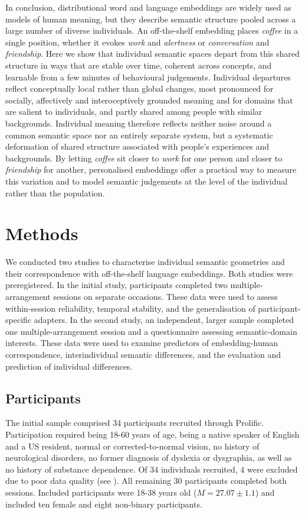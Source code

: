 \documentclass[pdflatex,sn-mathphys]{sn-jnl}
\begin{document}
In conclusion, distributional word and language embeddings are widely used as models of human meaning\cite{Goldstein2024,Xu2026,Caliskan2017,Wulff2025,Lee2025,Huth2016,Karpukhin2020}, but they describe semantic structure pooled across a large number of diverse individuals\cite{Bender2021,Atari2023,Paullada2021}. An off-the-shelf embedding places \textit{coffee} in a single position, whether it evokes \textit{work} and \textit{alertness} or \textit{conversation} and \textit{friendship}. Here we show that individual semantic spaces depart from this shared structure in ways that are stable over time, coherent across concepts, and learnable from a few minutes of behavioural judgements. Individual departures reflect conceptually local rather than global changes, most pronounced for socially, affectively and interoceptively grounded meaning and for domains that are salient to individuals, and partly shared among people with similar backgrounds. Individual meaning therefore reflects neither noise around a common semantic space nor an entirely separate system, but a systematic deformation of shared structure associated with people's experiences and backgrounds. By letting \textit{coffee} sit closer to \textit{work} for one person and closer to \textit{friendship} for another, personalised embeddings offer a practical way to measure this variation and to model semantic judgements at the level of the individual rather than the population.

\section{Methods}\label{methods}
We conducted two studies to characterise individual semantic geometries and their correspondence with off-the-shelf language embeddings. Both studies were preregistered\cite{Schneider2026b,Schneider2026c}. In the initial study, participants completed two multiple-arrangement sessions on separate occasions. These data were used to assess within-session reliability, temporal stability, and the generalisation of participant-specific adapters. In the second study, an independent, larger sample completed one multiple-arrangement session and a questionnaire assessing semantic-domain interests. These data were used to examine predictors of embedding-human correspondence, interindividual semantic differences, and the evaluation and prediction of individual differences.

\subsection{Participants}\label{participants}
The initial sample comprised 34 participants recruited through Prolific. Participation required being 18-60 years of age, being a native speaker of English and a US resident, normal or corrected-to-normal vision, no history of neurological disorders, no former diagnosis of dyslexia or dysgraphia, as well as no history of substance dependence. Of 34 individuals recruited, 4 were excluded due to poor data quality (see ). All remaining 30 participants completed both sessions. Included participants were 18-38 years old ($M = 27.07\pm1.1$) and included ten female and eight non-binary participants.
\end{document}
